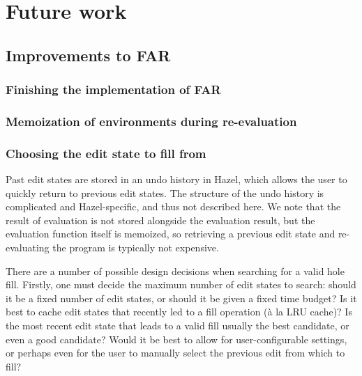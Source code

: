 \chapter{Future work}
\label{sec:future_work}

\section{Improvements to FAR}
\label{sec:far-improvements}

\subsection{Finishing the implementation of FAR}
\label{sec:finishing-far}





\subsection{Memoization of environments during re-evaluation}
\label{sec:far-improv-memo-envs}

\subsection{Choosing the edit state to fill from}
\label{sec:far-past-edit-states}

Past edit states are stored in an undo history in Hazel, which allows the user to quickly return to previous edit states. The structure of the undo history is complicated and Hazel-specific, and thus not described here. We note that the result of evaluation is not stored alongside the evaluation result, but the evaluation function itself is memoized, so retrieving a previous edit state and re-evaluating the program is typically not expensive.


There are a number of possible design decisions when searching for a valid hole fill. Firstly, one must decide the maximum number of edit states to search: should it be a fixed number of edit states, or should it be given a fixed time budget? Is it best to cache edit states that recently led to a fill operation (\`a la LRU cache)? Is the most recent edit state that leads to a valid fill usually the best candidate, or even a good candidate? Would it be best to allow for user-configurable settings, or perhaps even for the user to manually select the previous edit from which to fill?

